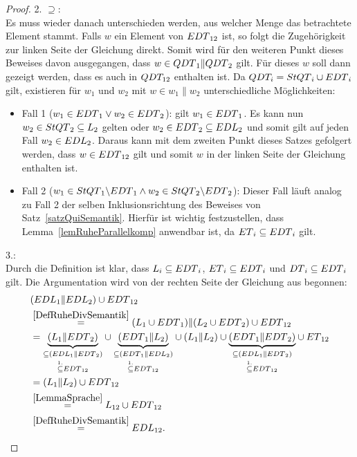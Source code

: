 \begin{proof}
  2. \glqq{}$\supseteq$\grqq{}:\\
  Es muss wieder danach unterschieden werden, aus welcher Menge das betrachtete
  Element stammt. Falls $w$ ein Element von $EDT{}_{12}$ ist, so folgt die
  Zugehörigkeit zur linken Seite der Gleichung direkt. Somit wird für den
  weiteren Punkt dieses Beweises davon ausgegangen, dass $w\in
  QDT{}_1\|QDT{}_2$ gilt. Für dieses $w$ soll dann gezeigt werden, dass es
  auch in $QDT_{12}$ enthalten ist. Da $QDT_i=StQT{}_i\cup EDT{}_i$ gilt,
  existieren für $w_1$ und $w_2$ mit $w\in w_1\|w_2$ unterschiedliche
  Möglichkeiten:
  \begin{itemize}
    \item Fall 1 ($w_1\in EDT{}_1 \vee w_2\in EDT{}_2$): \OBdA{} gilt $w_1\in
      EDT{}_1$. Es kann nun $w_2\in StQT{}_2 \subseteq L_2$ gelten oder
      $w_2\in EDT{}_2\subseteq EDL{}_2$ und somit gilt auf jeden Fall $w_2\in
      EDL{}_2$. Daraus kann mit dem zweiten Punkt dieses Satzes gefolgert
      werden, dass $w\in EDT{}_{12}$ gilt und somit $w$ in der linken Seite
      der Gleichung enthalten ist.
    \item Fall 2 ($w_1\in StQT{}_1\backslash EDT{}_1 \wedge w_2\in StQT{}_2
      \backslash EDT{}_2$): Dieser Fall läuft analog zu Fall 2 der selben
      Inklusionsrichtung des Beweises von Satz~\ref{satzQuiSemantik}. Hierfür
      ist wichtig festzustellen, dass Lemma~\ref{lemRuheParallelkomp} anwendbar
      ist, da $ET{}_i\subseteq EDT{}_i$ gilt.
  \end{itemize}

  3.:\\
  Durch die Definition ist klar, dass $L_i\subseteq EDT{}_i$,
  $ET{}_i\subseteq EDT{}_i$ und $DT{}_i\subseteq EDT{}_i$ gilt. Die
  Argumentation wird von der rechten Seite der Gleichung aus begonnen:
  \begin{align*}
    &(EDL{}_1\| EDL{}_2)\cup EDT{}_{12}\\
    &\overset{\ref{DefRuheDivSemantik}}{=}(L_1\cup EDT{}_1)\|(L_2\cup
    EDT{}_2)\cup EDT{}_{12}\\
    &=\underset{\overset{1.}{\subseteq} EDT{}_{12}}{\underset{\subseteq
    (EDL{}_1\|EDT{}_2)}{\underbrace{(L_1\|EDT{}_2)}}} \cup
    \underset{\overset{1.}{\subseteq} EDT{}_{12}}{\underset{\subseteq
    (EDT{}_1\|EDL{}_2)}{\underbrace{(EDT{}_1\|L_2)}}} \cup
    (L_1\|L_2) \cup \underset{\overset{1.}{\subseteq}
    EDT{}_{12}}{\underset{\subseteq
    (EDL{}_1\|EDT{}_2)}{\underbrace{(EDT{}_1\|EDT{}_2)}}} \cup ET{}_{12}\\
    &=(L_1\|L_2) \cup EDT{}_{12}\\
    &\overset{\ref{LemmaSprache}}{=}L_{12}\cup EDT{}_{12}\\
    &\overset{\ref{DefRuheDivSemantik}}{=}EDL{}_{12}.
  \end{align*}
\end{proof}

